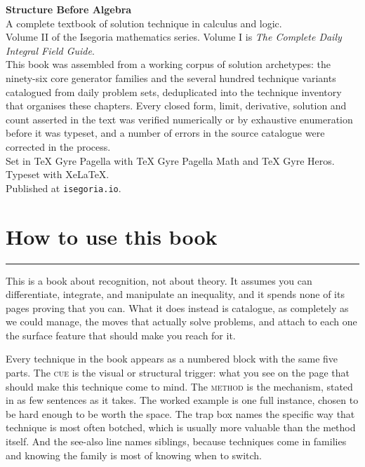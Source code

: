 \thispagestyle{empty}
\vspace*{\fill}
\begin{minipage}{\textwidth}
\small\color{ink!72}
\textbf{Structure Before Algebra}\\
A complete textbook of solution technique in calculus and logic.\\[6pt]
Volume II of the Isegoria mathematics series. Volume I is
\emph{The Complete Daily Integral Field Guide}.\\[6pt]
This book was assembled from a working corpus of solution archetypes: the
ninety-six core generator families and the several hundred technique variants
catalogued from daily problem sets, deduplicated into the technique inventory
that organises these chapters. Every closed form, limit, derivative, solution
and count asserted in the text was verified numerically or by exhaustive
enumeration before it was typeset, and a number of errors in the source
catalogue were corrected in the process.\\[6pt]
Set in TeX Gyre Pagella with TeX Gyre Pagella Math and TeX Gyre Heros.
Typeset with XeLaTeX.\\[6pt]
Published at \texttt{isegoria.io}.
\end{minipage}
\vspace*{\fill}
\clearpage

\thispagestyle{plain}
\section*{\sffamily\bfseries\color{navy}\fontsize{20}{24}\selectfont How to use this book}
\vspace{4pt}
{\color{rulegray}\rule{\textwidth}{0.6pt}}
\vspace{8pt}

This is a book about recognition, not about theory. It assumes you can
differentiate, integrate, and manipulate an inequality, and it spends none of
its pages proving that you can. What it does instead is catalogue, as
completely as we could manage, the moves that actually solve problems, and
attach to each one the surface feature that should make you reach for it.

Every technique in the book appears as a numbered block with the same five
parts. The \textsc{cue} is the visual or structural trigger: what you see on
the page that should make this technique come to mind. The \textsc{method} is
the mechanism, stated in as few sentences as it takes. The worked example is
one full instance, chosen to be hard enough to be worth the space. The trap
box names the specific way that technique is most often botched, which is
usually more valuable than the method itself. And the see-also line names
siblings, because techniques come in families and knowing the family is most
of knowing when to switch.

